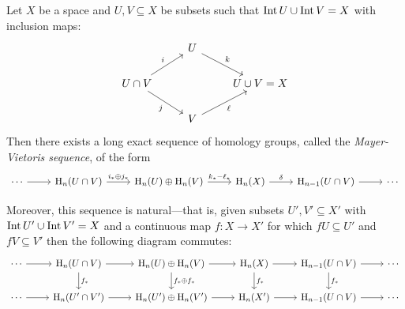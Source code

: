 \begin{theorem}
    \label{thm:mayer-vietoris}
    Let \(X\) be a space and \(U, V \subseteq X\) be subsets such that
    \(\operatorname{Int} U \cup \operatorname{Int} V = X\) with inclusion maps:
    \[
        \begin{tikzcd}
            &U \ar[rd, "k"] & \\
            U \cap V \ar[ur, "i"] \ar[rd, "j"'] & &U \cup V = X \\
            &V \ar[ru, "\ell"']&
        \end{tikzcd}
    \]
    Then there exists a long exact sequence of homology
    groups, called the \emph{Mayer-Vietoris sequence}, of the form
        {\small
            \[
                \begin{tikzcd}
                    \cdots \ar[r]
                    &\Hmlg_n(U \cap V) \ar[r, "i_* \oplus j_{*}"]
                    &\Hmlg_n(U) \oplus \Hmlg_n(V) \ar[r, "k_{*} - \ell_{*}"]
                    &\Hmlg_n(X) \ar[r, "\delta"]
                    &\Hmlg_{n-1}(U \cap V) \ar[r]
                    &\cdots
                \end{tikzcd}
            \]
        }

    Moreover, this sequence is natural---that is, given subsets
    \(U', V' \subseteq X'\) with \(\operatorname{Int} U' \cup \operatorname{Int} V' = X\) and a continuous map
    \(f: X \to X'\) for which \(f U \subseteq U'\) and \(f V \subseteq V'\) then the following diagram
    commutes:
    {\small
    \[
        \begin{tikzcd}
            \cdots \ar[r]
            &\Hmlg_n(U \cap V) \ar[r]
            \ar[d, "f_{*}"]
            &\Hmlg_n(U) \oplus \Hmlg_n(V) \ar[r]
            \ar[d, "f_{*} \oplus f_{*}"]
            &\Hmlg_n(X) \ar[r]
            \ar[d, "f_{*}"]
            &\Hmlg_{n-1}(U \cap V) \ar[r]
            \ar[d, "f_{*}"]
            &\cdots
            \\
            \cdots \ar[r]
            &\Hmlg_n(U' \cap V') \ar[r]
            &\Hmlg_n(U') \oplus \Hmlg_n(V') \ar[r]
            &\Hmlg_n(X') \ar[r]
            &\Hmlg_{n-1}(U \cap V) \ar[r]
            &\cdots
        \end{tikzcd}
    \]
    }
\end{theorem}

